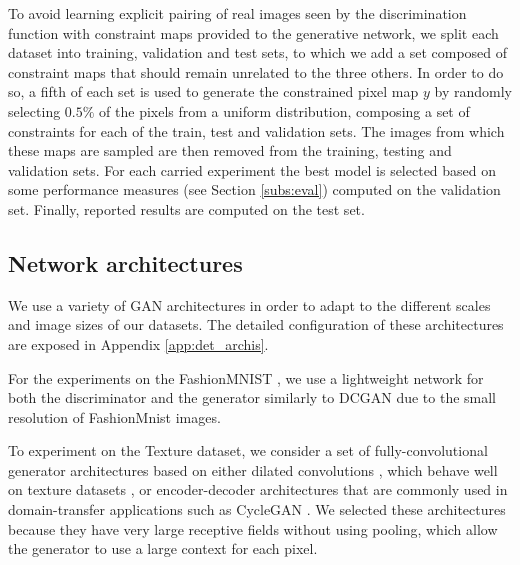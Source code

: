To avoid learning explicit pairing of real images seen by the discrimination function with constraint maps provided to the generative network, we split each dataset into training, validation and test sets, to which we add a set composed of constraint maps that should remain unrelated to the three others.
In order to do so, a fifth of each set is used to generate the constrained pixel map $y$ by randomly selecting $0.5\%$ of the pixels from a uniform distribution, composing a set of constraints for each of the train, test and validation sets. The images from which these maps are sampled are then removed from the training, testing and validation sets. For each carried experiment the best model is selected based on some performance measures (see Section \ref{subs:eval}) computed on the validation set. Finally, reported results are computed on the test set.



\subsection{Network architectures}
\label{subs:architectures}

We use a variety of GAN architectures in order to adapt to the different scales and image sizes of our datasets. The detailed configuration of these architectures are exposed in Appendix \ref{app:det_archis}.

For the experiments on the FashionMNIST \citep{Xiao2017}, we use a lightweight network for both the discriminator and the generator similarly to DCGAN  \citep{Radford2015} due to the small resolution of FashionMnist images.

To experiment on the Texture dataset, we consider a set of fully-convolutional generator architectures based on either dilated convolutions \citep{Yu2015}, which behave well on texture datasets \citep{Ruffino2019}, or encoder-decoder architectures that are commonly used in domain-transfer applications such as CycleGAN \citep{Zhu2017}. We selected these architectures because they have very large receptive fields without using pooling, which allow the generator to use a large context for each pixel.

